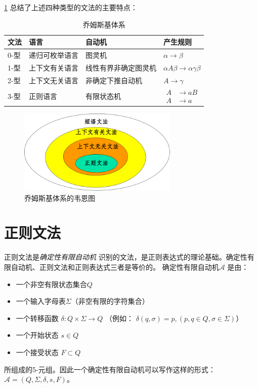 \cref{tab:ChomskyModels} 总结了上述四种类型的文法的主要特点：
\begin{table}[H]
  \centering
  \caption{乔姆斯基体系}
  \label{tab:ChomskyModels}
  \begin{tabular}{|l|l|l|l|}
    \hline
    文法 & 语言 & 自动机 & 产生规则 \\
    \hline
    0-型 & 递归可枚举语言 & 图灵机 & $\alpha \rightarrow \beta$ \\
    \hline
    1-型 & 上下文有关语言 & 线性有界非确定图灵机 & $\alpha A \beta \rightarrow \alpha \gamma \beta$ \\
    \hline
    2-型 & 上下文无关语言 & 非确定下推自动机 & $A \rightarrow \gamma $ \\
    \hline
    3-型 & 正则语言 & 有限状态机 &
    {$\begin{aligned}
        A & \rightarrow aB \\
        A & \rightarrow a
    \end{aligned}$} \tabularnewline
    \hline
  \end{tabular}
\end{table}

\begin{figure}[H]
  \centering
  \includegraphics[width=0.68\textwidth]{figure/chomsky_model.png}
  \caption{乔姆斯基体系的韦恩图}
  \label{fig:ChomskyVenn}
\end{figure}

\section{正则文法}
\def\DFA{确定性有限自动机}
正则文法是\emph{\DFA} 识别的文法，是正则表达式的理论基础。\DFA 、正则文法和正则表达式三者是等价的。
\DFA $\mathcal{A}$ 是由：
\begin{itemize}
  \item 一个非空有限状态集合$Q$
  \item 一个输入字母表$\Sigma$（非空有限的字符集合）
  \item 一个转移函数 $ \delta: Q \times \Sigma \rightarrow Q $
    （例如： $ \delta(q, \sigma) = p, (p, q \in Q, \sigma \in \Sigma) $）
  \item 一个开始状态 $ s \in Q $
  \item 一个接受状态 $ F \subset Q $
\end{itemize}
所组成的5-元组。因此一个\DFA 可以写作这样的形式：
$ \mathcal{A} = (Q, \Sigma, \delta, s, F) $。

